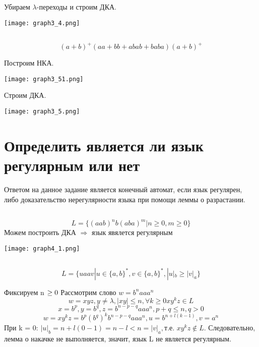 \documentclass[a4paper, 12pt]{article}
\begin{document}
Убираем $\lambda$-переходы и строим ДКА.
\begin{center}
    \texttt{[image: graph3\_4.png]}
\end{center}

\subsection{}
$$(a + b)^+(aa + bb + abab + baba)(a + b)^+$$

Построим НКА.
\begin{center}
    \texttt{[image: graph3\_51.png]}
\end{center}

Строим ДКА.
\begin{center}
    \texttt{[image: graph3\_5.png]}
\end{center}
\newpage

\section{Определить является ли язык регулярным или нет}
Ответом на данное задание является конечный автомат, если язык регулярен, либо доказательство нерегулярности языка при помощи леммы о разрастании.

\subsection{}
$$L = \{(aab)^nb(aba)^m | n \geq 0, m \geq 0\}$$
Можем построить ДКА $\Rightarrow$ язык явялется регулярным

\begin{center}
    \texttt{[image: graph4\_1.png]}
\end{center}

\subsection{}
$$L = \{uaav | u \in \{a,b\}^*, v \in \{a,b\}^*, |u|_b \geq |v|_a\}$$

Фиксируем n $\geq 0\\$
Рассмотрим слово $ w = b^naaa^n$
$$w = xyz,y \neq \lambda, |xy| \leq n, \forall k \geq 0 xy^kz \in L$$
$$ x = b^p, y = b^q, z = b^{n-p-q}aaa^n, p + q \leq n, q > 0$$
$$w = xy^kz = b^p(b^q)^kb^{n-p-q}aaa^n, u = b^{n+l(k-1)}, v = a^n$$
При k = 0: $|u|_b = n+l(0-1) = n - l < n = |v|_a, \text{т.е. } xy^kz \notin L$. Следовательно, лемма о накачке не выполняется, значит, язык L не является регулярным.
\end{document}
